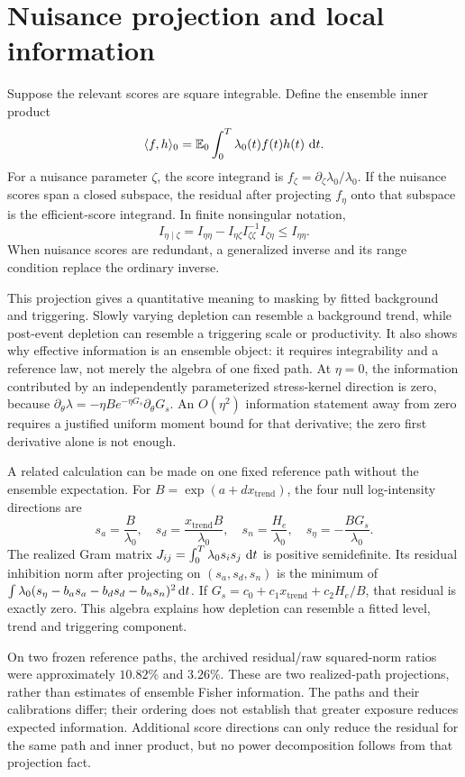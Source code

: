 \section{Nuisance projection and local information}

Suppose the relevant scores are square integrable. Define the ensemble inner product
\[
\langle f,h\rangle_0
=
\mathbb{E} _0\int_0^T\lambda_0(t)f(t)h(t)\,\mathop{}\!\mathrm{d} t.
\]
For a nuisance parameter \(\zeta\), the score integrand is
\(f_\zeta=\partial_\zeta\lambda_0/\lambda_0\). If the nuisance scores span a closed subspace, the residual after projecting \(f_\eta\) onto that subspace is the efficient-score integrand. In finite nonsingular notation,
\[
I_{\eta\mid\zeta}
=
I_{\eta\eta}-I_{\eta\zeta}I_{\zeta\zeta}^{-1}I_{\zeta\eta}
\le I_{\eta\eta}.
\]
When nuisance scores are redundant, a generalized inverse and its range condition replace the ordinary inverse.

This projection gives a quantitative meaning to masking by fitted background and triggering. Slowly varying depletion can resemble a background trend, while post-event depletion can resemble a triggering scale or productivity. It also shows why effective information is an ensemble object: it requires integrability and a reference law, not merely the algebra of one fixed path. At \(\eta=0\), the information contributed by an independently parameterized stress-kernel direction is zero, because
\(\partial_\theta\lambda=-\eta B e^{-\eta G_s}\partial_\theta G_s\).
An \(O(\eta^2)\) information statement away from zero requires a justified uniform moment bound for that derivative; the zero first derivative alone is not enough.

A related calculation can be made on one fixed reference path without the ensemble expectation. For \(B=\exp(a+d x_{\mathrm{trend}})\), the four null log-intensity directions are
\[
s_a=\frac B{\lambda_0},\quad
s_d=\frac{x_{\mathrm{trend}}B}{\lambda_0},\quad
s_n=\frac{H_e}{\lambda_0},\quad
s_\eta=-\frac{BG_s}{\lambda_0}.
\]
The realized Gram matrix \(J_{ij}=\int_0^T\lambda_0s_is_j\,\mathop{}\!\mathrm{d} t\) is positive semidefinite. Its residual inhibition norm after projecting on \((s_a,s_d,s_n)\) is the minimum of
\(\int\lambda_0(s_\eta-b_as_a-b_ds_d-b_ns_n)^2\mathop{}\!\mathrm{d} t\).
If \(G_s=c_0+c_1x_{\mathrm{trend}}+c_2H_e/B\), that residual is exactly zero. This algebra explains how depletion can resemble a fitted level, trend and triggering component.

On two frozen reference paths, the archived residual/raw squared-norm ratios were approximately \(10.82\%\) and \(3.26\%\). These are two realized-path projections, rather than estimates of ensemble Fisher information. The paths and their calibrations differ; their ordering does not establish that greater exposure reduces expected information. Additional score directions can only reduce the residual for the same path and inner product, but no power decomposition follows from that projection fact.

